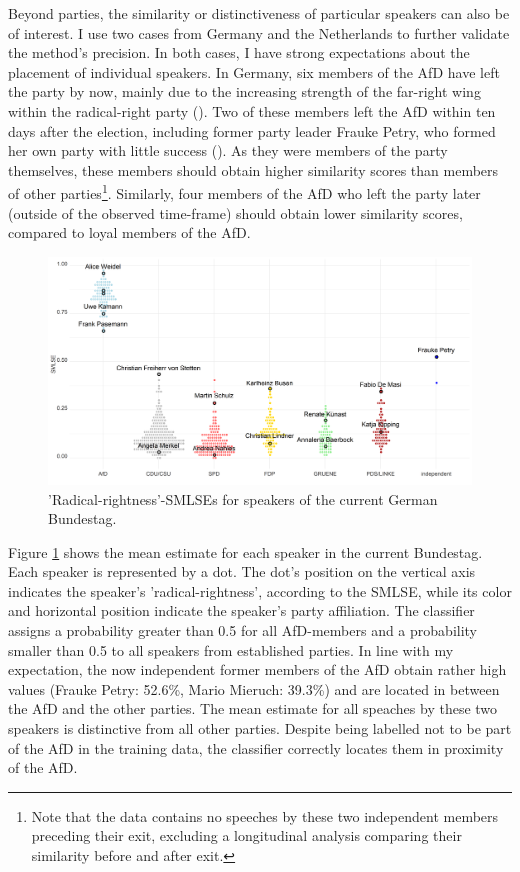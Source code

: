\documentclass{article}
\begin{document}
Beyond parties, the similarity or distinctiveness of particular speakers can also be of interest. I use two cases from Germany and the Netherlands to further validate the method's precision. In both cases, I have strong expectations about the placement of individual speakers. In Germany, six members of the AfD have left the party by now, mainly due to the increasing strength of the far-right wing within the radical-right party (\cite{Steffen2020AfD}). Two of these members left the AfD within ten days after the election, including former party leader Frauke Petry, who formed her own party  with little success (\cite{LSE2018AfD}). As they were members of the party themselves, these members should obtain higher similarity scores than members of other parties\footnote{Note that the data contains no speeches by these two independent members preceding their exit, excluding a longitudinal analysis comparing their similarity before and after exit.}. Similarly, four members of the AfD who left the party later (outside of the observed time-frame) should obtain lower similarity scores, compared to loyal members of the AfD. \par

\begin{figure}
    \centering
    \includegraphics[width=19cm]{DE/vis/DE_speakers.png}
    \caption{'Radical-rightness'-SMLSEs for speakers of the current German Bundestag.}
    \label{fig:speakers}
\end{figure}

Figure \ref{fig:speakers} shows the mean estimate for each speaker in the current Bundestag. Each speaker is represented by a dot. The dot's position on the vertical axis indicates the speaker's 'radical-rightness', according to the SMLSE, while its color and horizontal position indicate the speaker's party affiliation. The classifier assigns a probability greater than 0.5 for all AfD-members and a probability smaller than 0.5 to all speakers from established parties. In line with my expectation, the now independent former members of the AfD obtain rather high values (Frauke Petry: 52.6\%, Mario Mieruch: 39.3\%) and are located in between the AfD and the other parties. The mean estimate for all speaches by these two speakers is distinctive from all other parties. Despite being labelled not to be part of the AfD in the training data, the classifier correctly locates them in proximity of the AfD. \par
\end{document}
